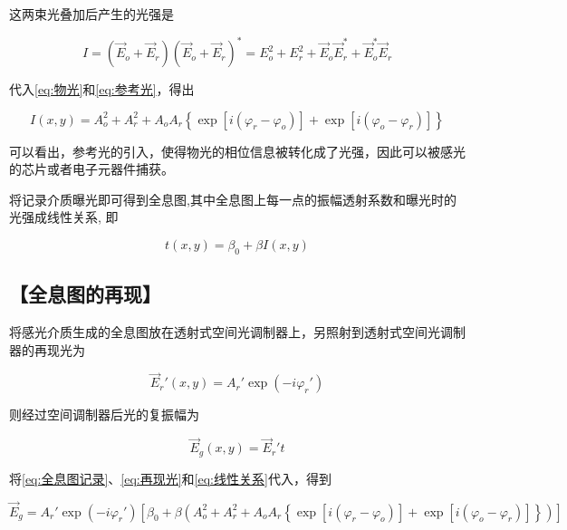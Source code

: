 \documentclass{ctexart}
\let\oldsubsection\subsection
\renewcommand{\subsection}[1]{\oldsubsection{\!\!\!\!\!\!【#1】}}
\begin{document}
这两束光叠加后产生的光强是

\begin{equation}
  I = \left( \vec{E}_o + \vec{E}_r \right) \left( \vec{E}_o + \vec{E}_r \right)^{*} = E_o^2 + E_r^2 + \vec{E}_o \vec{E}_r^{*} + \vec{E}_o^{*} \vec{E}_r
\end{equation}

代入\ref{eq:物光}和\ref{eq:参考光}，得出

\begin{equation}
  \label{eq:全息图记录}
  I \left( x, y \right) = A_o^2 + A_r^2 + A_o A_r \left\{ \exp \left[ i \left( \varphi_r - \varphi_o \right) \right] + \exp \left[ i \left( \varphi_o - \varphi_r \right) \right] \right\}
\end{equation}

可以看出，参考光的引入，使得物光的相位信息被转化成了光强，因此可以被感光的芯片或者电子元器件捕获。

将记录介质曝光即可得到全息图,其中全息图上每一点的振幅透射系数和曝光时的光强成线性关系,
即

\begin{equation}
  \label{eq:线性关系}
  t \left( x,y \right) = \beta_0 + \beta I \left( x, y \right)
\end{equation}

\subsection{全息图的再现}

将感光介质生成的全息图放在透射式空间光调制器上，另照射到透射式空间光调制器的再现光为

\begin{equation}
  \label{eq:再现光}
  \vec{E}_r' \left( x,y \right) = A_r' \exp \left( - i \varphi_r' \right)
\end{equation}

则经过空间调制器后光的复振幅为

\begin{equation}
  \label{eq:投射复振幅}
  \vec{E}_g \left( x,y \right) = \vec{E}_r' t
\end{equation}

将\ref{eq:全息图记录}、\ref{eq:再现光}和\ref{eq:线性关系}代入，得到

\begin{equation}
  \label{eq:全息再现}
  \vec{E}_g = A_r' \exp \left( - i \varphi_r' \right) \left[ \beta_0 + \beta \left( A_o^2 + A_r^2 + A_o A_r \left\{ \exp \left[ i \left( \varphi_r - \varphi_o \right) \right] + \exp \left[ i \left( \varphi_o - \varphi_r \right) \right] \right\} \right) \right]
\end{equation}
\end{document}
